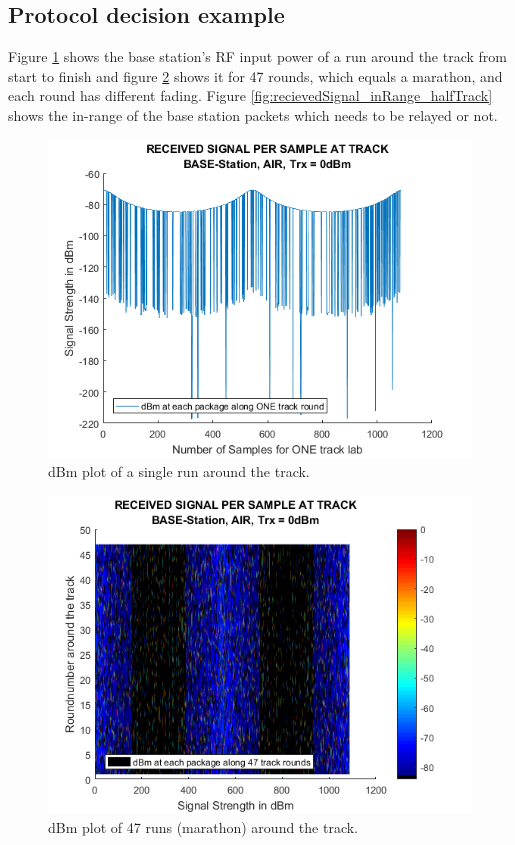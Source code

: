 \subsection{Protocol decision example}\label{sc:protocolDecisionExample}
Figure \ref{fig:recievedSignal_baseStation_air} shows the base station's RF input power of a run around the track from start to finish and figure \ref{fig:recievedSignal_baseStation_air2} shows it for 47 rounds, which equals a marathon, and each round has different fading. Figure \ref{fig:recievedSignal_inRange_halfTrack} shows the in-range of the base station packets which needs to be relayed or not.

\begin{figure}[h]
	\centering
	\includegraphics[width=\linewidth]{theory/protocolDecisionExample/fig/recievedSignal_baseStation_air.png}
	\caption{dBm plot of a single run around the track.}
	\label{fig:recievedSignal_baseStation_air}
\end{figure}

\begin{figure}[h]
	\centering
	\includegraphics[width=\linewidth]{theory/protocolDecisionExample/fig/recievedSignal_baseStation_air2.png}
	\caption{dBm plot of 47 runs (marathon) around the track.}
	\label{fig:recievedSignal_baseStation_air2}
\end{figure}

